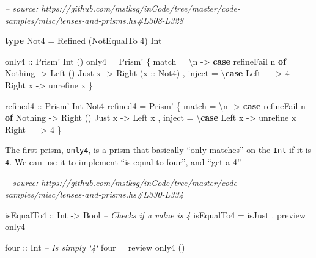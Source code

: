\documentclass[]{article}
\newenvironment{Shaded}{}{}
\newcommand{\CommentTok}[1]{\textcolor[rgb]{0.38,0.63,0.69}{\textit{#1}}}
\newcommand{\DataTypeTok}[1]{\textcolor[rgb]{0.56,0.13,0.00}{#1}}
\newcommand{\DecValTok}[1]{\textcolor[rgb]{0.25,0.63,0.44}{#1}}
\newcommand{\FunctionTok}[1]{\textcolor[rgb]{0.02,0.16,0.49}{#1}}
\newcommand{\KeywordTok}[1]{\textcolor[rgb]{0.00,0.44,0.13}{\textbf{#1}}}
\newcommand{\NormalTok}[1]{#1}
\newcommand{\OtherTok}[1]{\textcolor[rgb]{0.00,0.44,0.13}{#1}}
\begin{document}
\begin{Shaded}
\begin{Highlighting}[]
\CommentTok{-- source: https://github.com/mstksg/inCode/tree/master/code-samples/misc/lenses-and-prisms.hs#L308-L328}

\KeywordTok{type} \DataTypeTok{Not4} \FunctionTok{=} \DataTypeTok{Refined}\NormalTok{ (}\DataTypeTok{NotEqualTo} \DecValTok{4}\NormalTok{) }\DataTypeTok{Int}

\OtherTok{only4 ::} \DataTypeTok{Prism'} \DataTypeTok{Int}\NormalTok{ ()}
\NormalTok{only4 }\FunctionTok{=} \DataTypeTok{Prism'}
\NormalTok{    \{ match  }\FunctionTok{=}\NormalTok{ \textbackslash{}n }\OtherTok{->} \KeywordTok{case}\NormalTok{ refineFail n }\KeywordTok{of}
        \DataTypeTok{Nothing} \OtherTok{->} \DataTypeTok{Left}\NormalTok{ ()}
        \DataTypeTok{Just}\NormalTok{ x  }\OtherTok{->} \DataTypeTok{Right}\NormalTok{ (}\OtherTok{x ::} \DataTypeTok{Not4}\NormalTok{)}
\NormalTok{    , inject }\FunctionTok{=}\NormalTok{ \textbackslash{}}\KeywordTok{case}
        \DataTypeTok{Left}\NormalTok{  _ }\OtherTok{->} \DecValTok{4}
        \DataTypeTok{Right}\NormalTok{ x }\OtherTok{->}\NormalTok{ unrefine x}
\NormalTok{    \}}

\OtherTok{refined4 ::} \DataTypeTok{Prism'} \DataTypeTok{Int} \DataTypeTok{Not4}
\NormalTok{refined4 }\FunctionTok{=} \DataTypeTok{Prism'}
\NormalTok{    \{ match  }\FunctionTok{=}\NormalTok{ \textbackslash{}n }\OtherTok{->} \KeywordTok{case}\NormalTok{ refineFail n }\KeywordTok{of}
        \DataTypeTok{Nothing} \OtherTok{->} \DataTypeTok{Right}\NormalTok{ ()}
        \DataTypeTok{Just}\NormalTok{ x  }\OtherTok{->} \DataTypeTok{Left}\NormalTok{ x}
\NormalTok{    , inject }\FunctionTok{=}\NormalTok{ \textbackslash{}}\KeywordTok{case}
        \DataTypeTok{Left}\NormalTok{  x }\OtherTok{->}\NormalTok{ unrefine x}
        \DataTypeTok{Right}\NormalTok{ _ }\OtherTok{->} \DecValTok{4}
\NormalTok{    \}}
\end{Highlighting}
\end{Shaded}

The first prism, \texttt{only4}, is a prism that basically ``only matches'' on
the \texttt{Int} if it is \texttt{4}. We can use it to implement ``is equal to
four'', and ``get a 4''

\begin{Shaded}
\begin{Highlighting}[]
\CommentTok{-- source: https://github.com/mstksg/inCode/tree/master/code-samples/misc/lenses-and-prisms.hs#L330-L334}

\OtherTok{isEqualTo4 ::} \DataTypeTok{Int} \OtherTok{->} \DataTypeTok{Bool}   \CommentTok{-- Checks if a value is 4}
\NormalTok{isEqualTo4 }\FunctionTok{=}\NormalTok{ isJust }\FunctionTok{.}\NormalTok{ preview only4}

\OtherTok{four ::} \DataTypeTok{Int}     \CommentTok{-- Is simply `4`}
\NormalTok{four }\FunctionTok{=}\NormalTok{ review only4 ()}
\end{Highlighting}
\end{Shaded}
\end{document}

